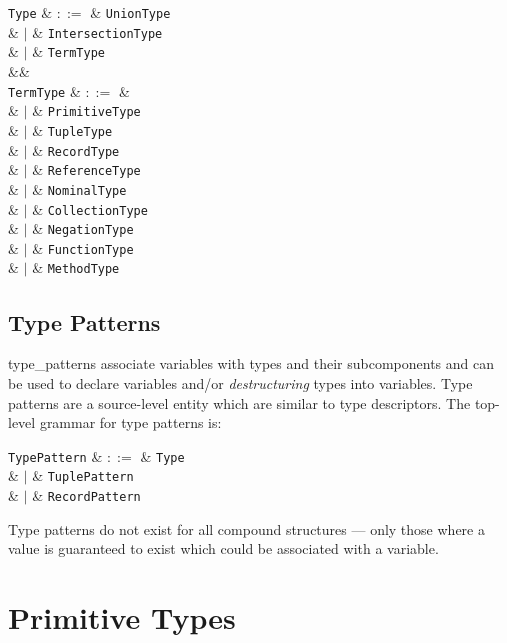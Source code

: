 \begin{syntax}
  \verb+Type+ & $::=$ & \verb+UnionType+ \\
              & $|$ & \verb+IntersectionType+ \\
              & $|$ & \verb+TermType+ \\
              &&\\
  \verb+TermType+ & $::=$ & \\
  & $|$ & \verb+PrimitiveType+ \\
  & $|$ & \verb+TupleType+ \\
  & $|$ & \verb+RecordType+ \\
  & $|$ & \verb+ReferenceType+ \\
  & $|$ & \verb+NominalType+ \\
  & $|$ & \verb+CollectionType+ \\
  & $|$ & \verb+NegationType+ \\
  & $|$ & \verb+FunctionType+ \\
  & $|$ & \verb+MethodType+ \\
\end{syntax}

\subsection{Type Patterns}
\label{c_types_type_patterns}

\Gls{type_pattern}s associate variables with types and their subcomponents and can be used to declare variables and/or {\em destructuring} types into variables.  Type patterns are a source-level entity which are similar to type descriptors.  The top-level grammar for type patterns is:

\begin{syntax}
  \verb+TypePattern+ & $::=$ & \verb+Type+ \\
              & $|$ & \verb+TuplePattern+ \\
              & $|$ & \verb+RecordPattern+ \\
\end{syntax}

Type patterns do not exist for all compound structures --- only those where a value is guaranteed to exist which could be associated with a variable.

\section{Primitive Types}
\label{c_types_primitive_types}

